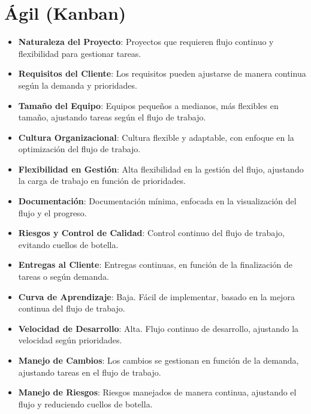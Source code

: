 \section{Ágil (Kanban)}
\begin{itemize}
    \item \textbf{Naturaleza del Proyecto}: Proyectos que requieren flujo continuo y flexibilidad para gestionar tareas.
    \item \textbf{Requisitos del Cliente}: Los requisitos pueden ajustarse de manera continua según la demanda y prioridades.
    \item \textbf{Tamaño del Equipo}: Equipos pequeños a medianos, más flexibles en tamaño, ajustando tareas según el flujo de trabajo.
    \item \textbf{Cultura Organizacional}: Cultura flexible y adaptable, con enfoque en la optimización del flujo de trabajo.
    \item \textbf{Flexibilidad en Gestión}: Alta flexibilidad en la gestión del flujo, ajustando la carga de trabajo en función de prioridades.
    \item \textbf{Documentación}: Documentación mínima, enfocada en la visualización del flujo y el progreso.
    \item \textbf{Riesgos y Control de Calidad}: Control continuo del flujo de trabajo, evitando cuellos de botella.
    \item \textbf{Entregas al Cliente}: Entregas continuas, en función de la finalización de tareas o según demanda.
    \item \textbf{Curva de Aprendizaje}: Baja. Fácil de implementar, basado en la mejora continua del flujo de trabajo.
    \item \textbf{Velocidad de Desarrollo}: Alta. Flujo continuo de desarrollo, ajustando la velocidad según prioridades.
    \item \textbf{Manejo de Cambios}: Los cambios se gestionan en función de la demanda, ajustando tareas en el flujo de trabajo.
    \item \textbf{Manejo de Riesgos}: Riesgos manejados de manera continua, ajustando el flujo y reduciendo cuellos de botella.
\end{itemize}

